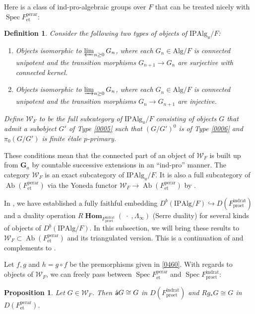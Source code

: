 \documentclass{amsart}
\newtheorem{Prop}[Thm]{Proposition}
\newtheorem{Def}[Thm]{Definition}
\theoremstyle{remark}
\numberwithin{equation}{subsection}
\newcommand{\into}{\hookrightarrow}
\newcommand{\compose}{\mathbin{\circ}}
\newcommand{\et}{\mathrm{et}}
\newcommand{\Ga}{\mathbf{G}_{a}}
\newcommand{\dirlim}{\varinjlim}
\newcommand{\invlim}{\varprojlim}
\newcommand{\rat}{\mathrm{rat}}
\newcommand{\ind}{\mathrm{ind}}
\newcommand{\pro}{\mathrm{pro}}
\newcommand{\perar}{\mathrm{perar}}
\newcommand{\Alg}{\mathrm{Alg}}
\newcommand{\Ind}{\mathrm{I}}
\newcommand{\Pro}{\mathrm{P}}
\newcommand{\alg}[1]{\mathbf{#1}}
\newcommand{\var}{\;\cdot\;}
\newcommand{\algebrize}{\Acute{\mathsf{a}}}
\DeclareMathOperator{\Spec}{Spec}
\DeclareMathOperator{\Ab}{Ab}
\DeclareMathOperator{\sheafhom}{\alg{Hom}}
\begin{document}
Here is a class of ind-pro-algebraic groups over $F$
that can be treated nicely with $\Spec F^{\perar}_{\et}$:

\begin{Def} \label{0149}
	Consider the following two types of objects of $\Ind \Pro \Alg_{u} / F$:
	\begin{enumerate}
		\item \label{0005}
			Objects isomorphic to $\invlim_{n \ge 0} G_{n}$,
			where each $G_{n} \in \Alg / F$ is connected unipotent
			and the transition morphisms $G_{n + 1} \to G_{n}$ are surjective
			with connected kernel.
		\item \label{0006}
			Objects isomorphic to $\dirlim_{n \ge 0} G_{n}$,
			where each $G_{n} \in \Alg / F$ is connected unipotent
			and the transition morphisms $G_{n} \to G_{n + 1}$ are injective.
	\end{enumerate}
	Define $\mathcal{W}_{F}$ to be the full subcategory of $\Ind \Pro \Alg_{u} / F$
	consisting of objects $G$ that admit a subobject $G'$ of Type \eqref{0005}
	such that $(G / G')^{0}$ is of Type \eqref{0006}
	and $\pi_{0}(G / G')$ is finite \'etale $p$-primary.
\end{Def}

These conditions mean that the connected part of an object of $\mathcal{W}_{F}$ is
built up from $\Ga$ by countable successive extensions in an ``ind-pro'' manner.
The category $\mathcal{W}_{F}$ is an exact subcategory of $\Ind \Pro \Alg_{u} / F$.
It is also a full subcategory of $\Ab(F^{\perar}_{\et})$
via the Yoneda functor $\mathcal{W}_{F} \to \Ab(F^{\perar}_{\et})$
by \cite[Proposition 7.1]{Suz21}.

In \cite[\S 2]{Suz20}, we have established a fully faithful embedding
$D^{b}(\Ind \Pro \Alg / F) \into D(F^{\ind\rat}_{\pro\et})$
and a duality operation $R \sheafhom_{F^{\ind\rat}_{\pro\et}}(\var, \Lambda_{\infty})$
(Serre duality) for several kinds of objects of $D^{b}(\Ind \Pro \Alg / F)$.
In this subsection, we will bring these results to $\mathcal{W}_{F} \subset \Ab(F^{\perar}_{\et})$
and its triangulated version.
This is a continuation of and complements to \cite{Suz21}.

Let $f, g$ and $h = g \compose f$ be the premorphisms given in \eqref{0460}.
With regards to objects of $\mathcal{W}_{F}$,
we can freely pass between $\Spec F^{\perar}_{\et}$ and $\Spec F^{\ind\rat}_{\pro\et}$:

\begin{Prop} \label{0492}
	Let $G \in \mathcal{W}_{F}$.
	Then $\algebrize G \cong G$ in $D(F^{\ind\rat}_{\pro\et})$
	and $R g_{\ast} G \cong G$ in $D(F^{\perar}_{\et})$.
\end{Prop}
\end{document}
